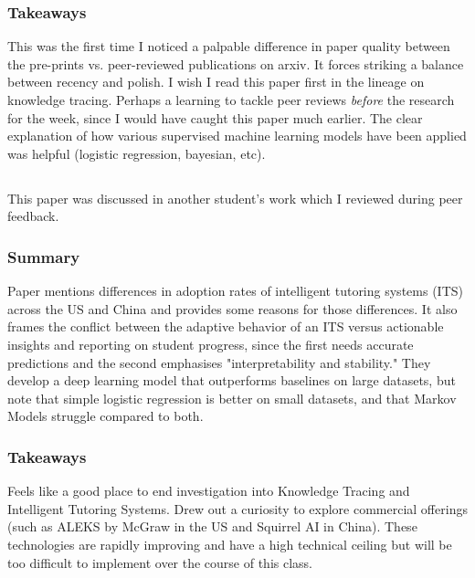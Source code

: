 \documentclass[
	letterpaper, %
]{jdf}
\begin{document}
\subsubsection{Takeaways}
This was the first time I noticed a palpable difference in paper quality between the pre-prints vs. peer-reviewed publications on arxiv. It forces striking a balance between recency and polish. I wish I read this paper first in the lineage on knowledge tracing. Perhaps a learning to tackle peer reviews \textit{before} the research for the week, since I would have caught this paper much earlier. The clear explanation of how various supervised machine learning models have been applied was helpful (logistic regression, bayesian, etc).

\subsection{}
This paper was discussed in another student's work which I reviewed during peer feedback.

\subsubsection{Summary}
Paper mentions differences in adoption rates of intelligent tutoring systems (ITS) across the US and China and provides some reasons for those differences. It also frames the conflict between the adaptive behavior of an ITS versus actionable insights and reporting on student progress, since the first needs accurate predictions and the second emphasises "interpretability and stability." They develop a deep learning model that outperforms baselines on large datasets, but note that simple logistic regression is better on small datasets, and that Markov Models struggle compared to both.

\subsubsection{Takeaways}
Feels like a good place to end investigation into Knowledge Tracing and Intelligent Tutoring Systems. Drew out a curiosity to explore commercial offerings (such as ALEKS by McGraw in the US and Squirrel AI in China). These technologies are rapidly improving and have a high technical ceiling but will be too difficult to implement over the course of this class.
\end{document}
